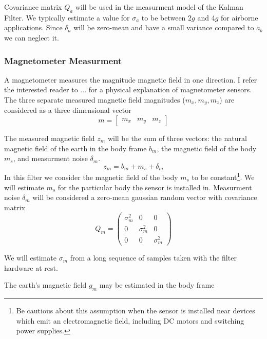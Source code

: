 \documentclass[12pt]{report}
\begin{document}
Covariance matrix $Q_a$ will be used in the measurment model of the Kalman Filter. We typically estimate a value for $\sigma_a$ to be between 2$g$ and 4$g$ for airborne applications. Since $\delta_a$ will be zero-mean and have a small variance compared to $a_b$ we can neglect it.

\subsubsection{Magnetometer Measurment}

A magnetometer measures the magnitude magnetic field in one direction. I refer the interested reader to ... for a physical explanation of magnetometer sensors. The three separate measured magnetic field magnitudes ($m_x, m_y, m_z$) are considered as a three dimensional vector
\begin{equation} \label{eq:defb}
  m = \begin{bmatrix} m_x & m_y & m_z \end{bmatrix}
\end{equation}

The measured magnetic field $z_m$ will be the sum of three vectors: the natural magnetic field of the earth in the body frame $b_m$, the magnetic field of the body $m_s$, and measurment noise $\delta_m$.
\begin{equation} \label{eq:zm}
  z_m = b_m + m_s + \delta_m
\end{equation}
In this filter we consider the magnetic field of the body $m_s$ to be constant\footnote{Be cautious about this assumption when the sensor is installed near devices which emit an electromagnetic field, including DC motors and switching power supplies.}. We will estimate $m_s$ for the particular body the sensor is installed in. Measurment noise $\delta_m$ will be considered a zero-mean gaussian random vector with covariance matrix
\begin{equation} \label{eq:Qm}
  Q_m = \begin{pmatrix} \sigma_m^2 & 0 & 0 \\
	                      0 & \sigma_m^2 & 0 \\ 
	                      0 & 0 & \sigma_m^2 \end{pmatrix} 
\end{equation}

We will estimate $\sigma_m$ from a long sequence of samples taken with the filter hardware at rest.

The earth's magnetic field $g_m$ may be estimated in the body frame
\end{document}
